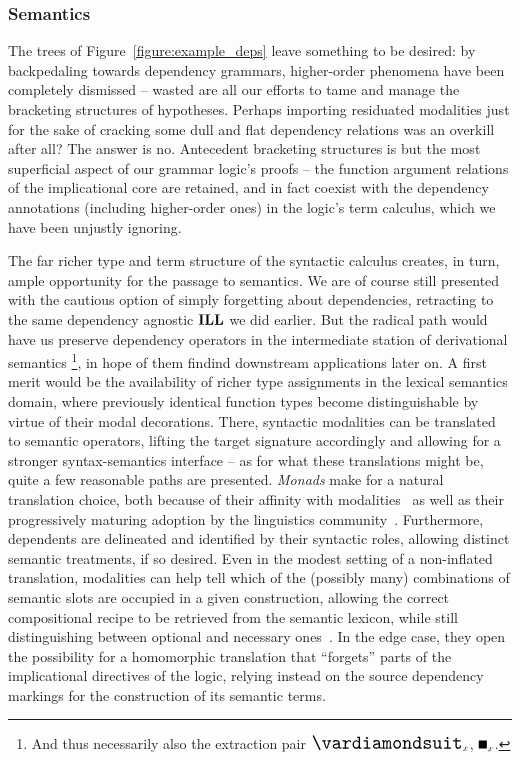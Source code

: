 \subsubsection{Semantics}
The trees of Figure~\ref{figure:example_deps} leave something to be desired: by backpedaling towards dependency grammars, higher-order phenomena have been completely dismissed -- wasted are all our efforts to tame and manage the bracketing structures of hypotheses.
Perhaps importing residuated modalities just for the sake of cracking some dull and flat dependency relations was an overkill after all?
The answer is no.
Antecedent bracketing structures is but the most superficial aspect of our grammar logic's proofs -- the function argument relations of the implicational core are retained, and in fact coexist with the dependency annotations (including higher-order ones) in the logic's term calculus, which we have been unjustly ignoring.

The far richer type and term structure of the syntactic calculus creates, in turn, ample opportunity for the passage to semantics.
We are of course still presented with the cautious option of simply forgetting about dependencies, retracting to the same dependency agnostic $\textbf{ILL}$ we did earlier.
But the radical path would have us preserve dependency operators in the intermediate station of derivational semantics%
	\footnote{And thus necessarily also the extraction pair $\dxdia{x}$, $\dxbox{x}$.},
in hope of them findind downstream applications later on.
A first merit would be the availability of richer type assignments in the lexical semantics domain, where previously identical function types become distinguishable by virtue of their modal decorations.
There, syntactic modalities can be translated to semantic operators, lifting the target signature accordingly and allowing for a stronger syntax-semantics interface -- as for what these translations might be, quite a few reasonable paths are presented.
\textit{Monads} make for a natural translation choice, both because of their affinity with modalities~\cite{kobayashi1997monad,corfield2020modal} as well as their progressively maturing adoption by the linguistics community~\cite{asudeh2020enriched}.
Furthermore, dependents are delineated and identified by their syntactic roles, allowing distinct semantic treatments, if so desired.
Even in the modest setting of a non-inflated translation, modalities can help tell which of the (possibly many) combinations of semantic slots are occupied in a given construction, allowing the correct compositional recipe to be retrieved from the semantic lexicon, while still distinguishing between optional and necessary ones~\cite{asudeh2012flexible}.
In the edge case, they open the possibility for a homomorphic translation that ``forgets'' parts of the implicational directives of the logic, relying instead on the source dependency markings for the construction of its semantic terms.


